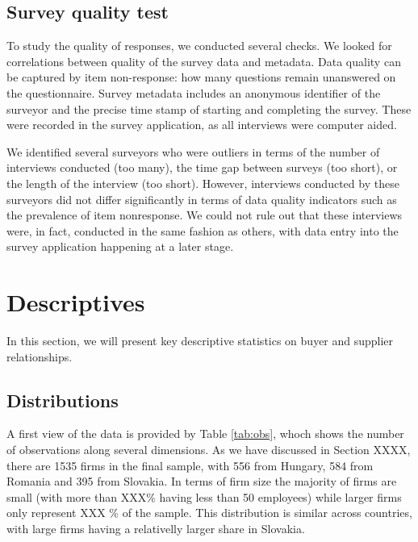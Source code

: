 \documentclass[final, dvipsnames, authoryear,12pt]{elsarticle}
\begin{document}
\subsection{Survey quality test}
To study the quality of responses, we conducted several checks. We looked for correlations between quality of the survey data and metadata. Data quality can be captured by item non-response: how many questions remain unanswered on the questionnaire. Survey metadata includes an anonymous identifier of the surveyor and the precise time stamp of starting and completing the survey. These were recorded in the survey application, as all interviews were computer aided. 

We identified several surveyors who were outliers in terms of the number of interviews conducted (too many), the time gap between surveys (too short), or the length of the interview (too short). However, interviews conducted by these surveyors did not differ significantly in terms of data quality indicators such as the prevalence of item nonresponse. We could not rule out that these interviews were, in fact, conducted in the same fashion as others, with data entry into the survey application happening at a later stage.


\section{Descriptives}

In this section, we will present key descriptive statistics on buyer and supplier relationships. 



\subsection{Distributions}


A first view of the data is provided by Table \ref{tab:obs}, whoch shows the number of observations along several dimensions. As we have discussed in Section XXXX, there are 1535 firms in the final sample, with 556 from Hungary, 584 from Romania and 395 from Slovakia.  In terms of firm size the majority of firms are small (with more than XXX\% having less than 50 employees) while larger firms only represent XXX \% of the sample. This distribution is similar across countries, with large firms having a relativelly larger share in Slovakia.
\end{document}
